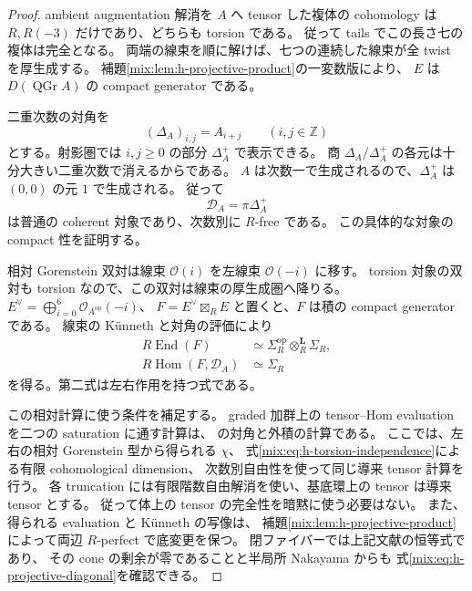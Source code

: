 \begin{proof}
ambient augmentation 解消を $A$ へ tensor した複体の cohomology は
$R,R(-3)$ だけであり、どちらも torsion である。
従って tails でこの長さ七の複体は完全となる。
両端の線束を順に解けば、七つの連続した線束が全 twist を厚生成する。
補題\ref{mix:lem:h-projective-product}の一変数版により、
$E$ は $D(\operatorname{QGr}A)$ の compact generator である。

二重次数の対角を
\[
 (\Delta_A)_{i,j}=A_{i+j}\qquad(i,j\in\mathbb Z)
\]
とする。射影圏では $i,j\ge0$ の部分 $\Delta_A^+$ で表示できる。
商 $\Delta_A/\Delta_A^+$ の各元は十分大きい二重次数で消えるからである。
$A$ は次数一で生成されるので、$\Delta_A^+$ は $(0,0)$ の元 $1$ で生成される。
従って
\[
 \mathcal D_A=\pi\Delta_A^+
\]
は普通の coherent 対象であり、次数別に $R$-free である。
この具体的な対象の compact 性を証明する。

相対 Gorenstein 双対は線束 $\mathcal O(i)$ を左線束 $\mathcal O(-i)$ に移す。
torsion 対象の双対も torsion なので、この双対は線束の厚生成圏へ降りる。
$E^\vee=\bigoplus_{i=0}^{6}\mathcal O_{A^{\mathrm{op}}}(-i)$、
$F=E^\vee\boxtimes_RE$ と置くと、$F$ は積の compact generator である。
線束の K\"unneth と対角の評価により
\begin{equation}\label{mix:eq:h-projective-diagonal}
 \begin{split}
 R\operatorname{End}(F)&\simeq
       \Sigma_R^{\mathrm{op}}\otimes_R^{\mathbf L}\Sigma_R,\\
 R\operatorname{Hom}(F,\mathcal D_A)&\simeq\Sigma_R
 \end{split}
\end{equation}
を得る。第二式は左右作用を持つ式である。

この相対計算に使う条件を補足する。
graded 加群上の tensor--Hom evaluation を二つの saturation に通す計算は、
\cite[Propositions~3.42, 4.14, Theorem~4.15, Remark~4.17]{CMOBallardFarman}
の対角と外積の計算である。
ここでは、左右の相対 Gorenstein 型から得られる $\chi$、
式\eqref{mix:eq:h-torsion-independence}による有限 cohomological dimension、
次数別自由性を使って同じ導来 tensor 計算を行う。
各 truncation には有限階数自由解消を使い、基底環上の tensor は導来 tensor とする。
従って体上の tensor の完全性を暗黙に使う必要はない。
また、得られる evaluation と K\"unneth の写像は、
補題\ref{mix:lem:h-projective-product}によって両辺 $R$-perfect で底変更を保つ。
閉ファイバーでは上記文献の恒等式であり、
その cone の剰余が零であることと半局所 Nakayama からも
式\eqref{mix:eq:h-projective-diagonal}を確認できる。


\end{proof}
